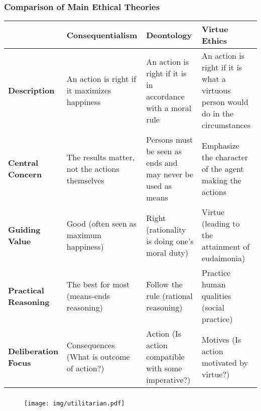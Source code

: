 \documentclass[UTF8,11pt,colorlinks,compress,openany]{beamer}%
\begin{document}
\begin{frame}\frametitle{Comparison of Main Ethical Theories}\small
\begin{table}[H]
\abovetabulinesep=1mm
\belowtabulinesep=1mm
\begin{tabu}{p{0.15\textwidth}|p{0.21\textwidth}|p{0.23\textwidth}|p{0.25\textwidth}}
\hline
& \textbf{Consequentialism} & \textbf{Deontology} & \textbf{Virtue Ethics}\\
\hline
\textbf{Description} & An action is right if it maximizes happiness & An action is right if it is in accordance with a moral rule & An action is right if it is what a virtuous person would do in the circumstances\\
\hline
\textbf{Central Concern} & The results matter, not the actions themselves & Persons must be seen as ends and may never be used as means & Emphasize the character of the agent making the actions\\
\hline
\textbf{Guiding Value} & Good (often seen as maximum happiness) & Right (rationality is doing one's moral duty) & Virtue (leading to the attainment of eudaimonia)\\
\hline
\textbf{Practical Reasoning} & The best for most (means-ends reasoning) & Follow the rule (rational reasoning) & Practice human qualities (social practice)\\
\hline
\textbf{Deliberation Focus} & Consequences (What is outcome of action?) & Action (Is action compatible with some imperative?) & Motives (Is action motivated by virtue?)\\
\hline
\end{tabu}
\end{table}
\end{frame}

\begin{frame}\frametitle{}
\begin{figure}[H]
\texttt{[image: img/utilitarian.pdf]}
\end{figure}
\end{frame}
\end{document}
